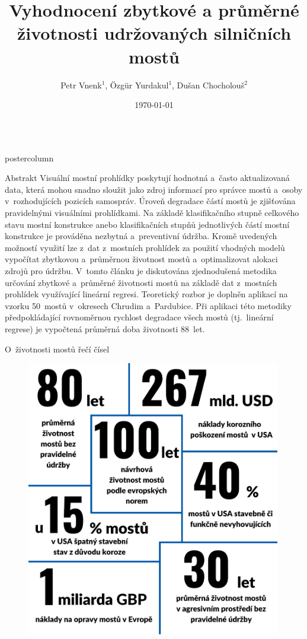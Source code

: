 \documentclass{beamer}
\title{\huge Vyhodnocení zbytkové a průměrné životnosti udržovaných silničních mostů}
\author{Petr Vnenk$^{1}$, Özgür Yurdakul$^{1}$, Dušan Chocholouš$^{2}$}
\institute{$^{1}$Dopravní fakulta Jana Pernera, Univerzita Pardubice \\ $^{2}$Správa a údržba silnic Pardubického kraje}
\date{\today}
\newlength{\columnheight}
\begin{document}
\begin{frame}
\begin{columns}
	\begin{column}{.4\textwidth}
		\begin{beamercolorbox}[center]{postercolumn}
			\begin{minipage}{.98\textwidth}  %
				\parbox[t][\columnheight]{\textwidth}{ %
					\begin{myblock}{Abstrakt}
						Visuální mostní prohlídky poskytují hodnotná a~často aktualizovaná data, která mohou snadno sloužit jako zdroj informací pro správce mostů a~osoby v~rozhodujících pozicích samospráv. Úroveň degradace částí mostů je zjišťována pravidelnými visuálními prohlídkami. Na základě klasifikačního stupně celkového stavu mostní konstrukce anebo klasifikačních stupňů jednotlivých částí mostní konstrukce je prováděna nezbytná a~preventivní údržba. Kromě uvedených možností využití lze z~dat z~mostních prohlídek za použití vhodných modelů vypočítat zbytkovou a~průměrnou životnost mostů a~optimalizovat alokaci zdrojů pro údržbu. V~tomto článku je diskutována zjednodušená metodika určování zbytkové a~průměrné životnosti mostů na základě dat z~mostních prohlídek využívající lineární regresi. Teoretický rozbor je doplněn aplikací na vzorku 50~mostů v~okresech Chrudim a~Pardubice. Při aplikaci této metodiky předpokládající rovnoměrnou rychlost degradace všech mostů (tj.~lineární regrese) je vypočtená průměrná doba životnosti 88~let.
					\end{myblock}\vfill
					\begin{myblock}{O~životnosti mostů řečí čísel}
						\begin{figure}
							\centering\includegraphics[width=0.99\textwidth]{img/poster3}

\end{figure}
\end{myblock}}
\end{minipage}
\end{beamercolorbox}
\end{column}
\end{columns}
\end{frame}
\end{document}
